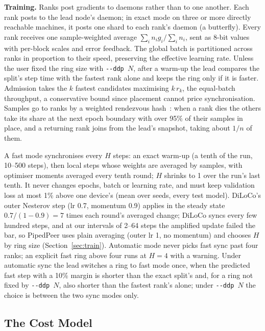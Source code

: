 \documentclass[conference]{IEEEtran}
\begin{document}
\textbf{Training.} Ranks post gradients to daemons rather than to one
another. Each rank posts to the lead node's daemon; in exact mode on three or
more directly reachable machines, it posts one shard to each rank's daemon (a
butterfly). Every rank receives one sample-weighted average
$\sum_i n_i g_i / \sum_i n_i$, sent as 8-bit values with per-block scales and
error feedback. The global batch is partitioned across ranks in proportion to their
speed, preserving the effective learning rate. Unless the user fixed the ring
size with \texttt{-{}-ddp~$N$}, after a warm-up the lead compares the split's
step time with the fastest rank alone and keeps the ring only if it is faster.
Admission takes the $k$ fastest candidates maximising $k\,r_k$, the
equal-batch throughput, a conservative bound since placement cannot price
synchronisation.
Samples go to ranks by a weighted rendezvous
hash~\cite{thaler1998rendezvous}: when a rank dies the others take its share at
the next epoch boundary with over 95\% of their samples in place, and a
returning rank joins from the lead's snapshot, taking about $1/n$ of them.

A fast mode synchronises every $H$ steps: an exact warm-up (a tenth of the
run, 10--500 steps), then local steps
whose weights are averaged by samples, with optimiser moments averaged every
tenth round; $H$ shrinks to 1 over the run's last tenth. It never changes epochs, batch or learning rate, and must keep
validation loss at most 1\% above one device's (mean over seeds, every test
model). DiLoCo's outer Nesterov step (lr 0.7, momentum 0.9) applies in the
steady state $0.7/(1-0.9)=7$ times each round's averaged change; DiLoCo syncs
every few hundred steps, and at our intervals of 2--64 steps the amplified
update failed the bar, so PipedPeer uses plain averaging (outer lr 1, no
momentum) and chooses $H$ by ring size (Section~\ref{sec:train}).
Automatic mode never picks fast sync past four ranks; an explicit fast ring
above four runs at $H=4$ with a warning. Under automatic sync the lead switches a
ring to fast mode once, when the predicted fast step with a 10\% margin is
shorter than the exact split's and, for a ring not fixed by
\texttt{-{}-ddp~$N$}, also shorter than the fastest rank's alone; under
\texttt{-{}-ddp~$N$} the choice is between the two sync modes only.

\subsection{The Cost Model}
\label{sec:cost}
\end{document}
